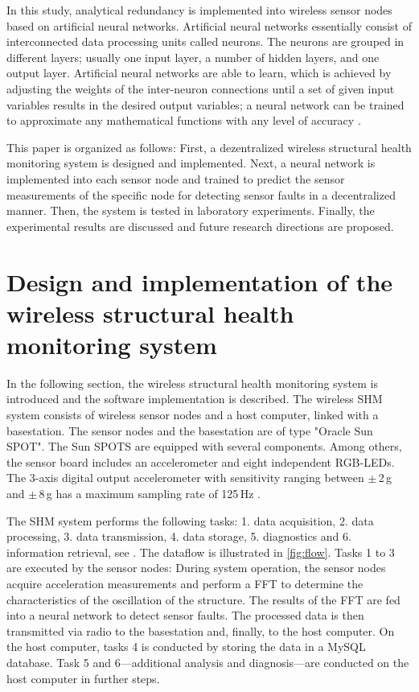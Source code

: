 \documentclass[12pt,a4paper]{scrartcl}
\begin{document}
In this study, analytical redundancy is implemented into wireless sensor nodes based on artificial neural networks.
Artificial neural networks essentially consist of interconnected data processing units called neurons. 
The neurons are grouped in different layers; usually one input layer, a number of hidden layers, and one output layer.
Artificial neural networks are able to learn, which is achieved by adjusting the weights of the inter-neuron connections until a set of given input variables results in the desired output variables; a neural network can be trained to approximate any mathematical functions with any level of accuracy \citep{Li2011}.

This paper is organized as follows:
First, a dezentralized wireless structural health monitoring system is designed and implemented. 
Next, a neural network is implemented into each sensor node and trained to predict the sensor measurements of the specific node for detecting sensor faults in a decentralized manner. 
Then, the system is tested in laboratory experiments. 
Finally, the experimental results are discussed and future research directions are proposed.



\section*{Design and implementation of the wireless structural health monitoring system}
In the following section, the wireless structural health monitoring system is introduced and the software implementation is described.
The wireless SHM system consists of wireless sensor nodes and a host computer, linked with a basestation.
The sensor nodes and the basestation are of type "Oracle Sun SPOT". 
The Sun SPOTS are equipped with several components.
Among others, the sensor board includes an accelerometer and eight independent RGB-LEDs.
The 3-axis digital output accelerometer with sensitivity ranging between $\pm$\,2\,g and $\pm$\,8\,g has a maximum sampling rate of 125\,Hz \citep{eDemo2010}.

The SHM system performs the following tasks:
1. data acquisition,
2. data processing,
3. data transmission, 
4. data storage,
5. diagnostics and 
6. information retrieval, see \citet{BisbySHM}.
The dataflow is illustrated in \autoref{fig:flow}.
Tasks 1 to 3 are executed by the sensor nodes: During system operation, the sensor nodes acquire acceleration measurements and perform a FFT to determine the characteristics of the oscillation of the structure.
The results of the FFT are fed into a neural network to detect sensor faults.
The processed data is then transmitted via radio to the basestation and, finally, to the host computer.
On the host computer, tasks 4 is conducted by storing the data in a MySQL database.
Task 5 and 6---additional analysis and diagnosis---are conducted on the host computer in further steps.
\end{document}
